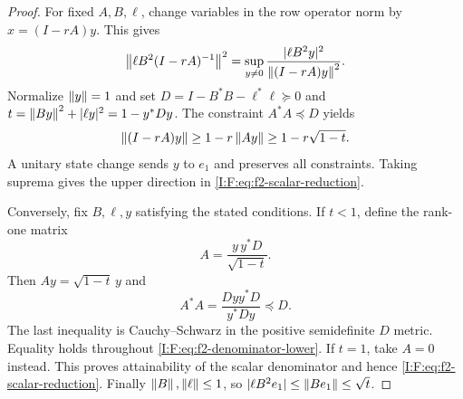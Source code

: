 \begin{proof}
For fixed $A,B,\ell$, change variables in the row operator norm by
$x=(I-rA)y$.  This gives
\[
 \left\lVert\ell B^2(I-rA)^{-1}\right\rVert^2
 =\sup_{y\ne0}\frac{|\ell B^2y|^2}{\left\lVert(I-rA)y\right\rVert^2}.
\]
Normalize $\left\lVert y\right\rVert=1$ and set
$D=I-B^*B-\ell^*\ell\succeq0$ and
$t=\left\lVert By\right\rVert^2+|\ell y|^2=1-y^*Dy$.
The constraint $A^*A\preceq D$ yields
\begin{equation}
 \left\lVert(I-rA)y\right\rVert\ge1-r\left\lVert Ay\right\rVert
                 \ge1-r\sqrt{1-t}.
 \label{I:F:eq:f2-denominator-lower}
\end{equation}
A unitary state change sends $y$ to $e_1$ and preserves all constraints.
Taking suprema gives the upper direction in
\eqref{I:F:eq:f2-scalar-reduction}.

Conversely, fix $B,\ell,y$ satisfying the stated conditions.  If $t<1$,
define the rank-one matrix
\begin{equation}
 A=\frac{y\,y^*D}{\sqrt{1-t}}.
 \label{I:F:eq:f2-A-completion}
\end{equation}
Then $Ay=\sqrt{1-t}\,y$ and
\[
 A^*A=\frac{Dyy^*D}{y^*Dy}\preceq D.
\]
The last inequality is Cauchy--Schwarz in the positive semidefinite
$D$ metric.  Equality holds throughout
\eqref{I:F:eq:f2-denominator-lower}.  If $t=1$, take $A=0$ instead.
This proves attainability of the scalar denominator and hence
\eqref{I:F:eq:f2-scalar-reduction}.
Finally $\left\lVert B\right\rVert,\left\lVert\ell\right\rVert\le1$, so
$|\ell B^2e_1|\le\left\lVert Be_1\right\rVert\le\sqrt t$.
\end{proof}
